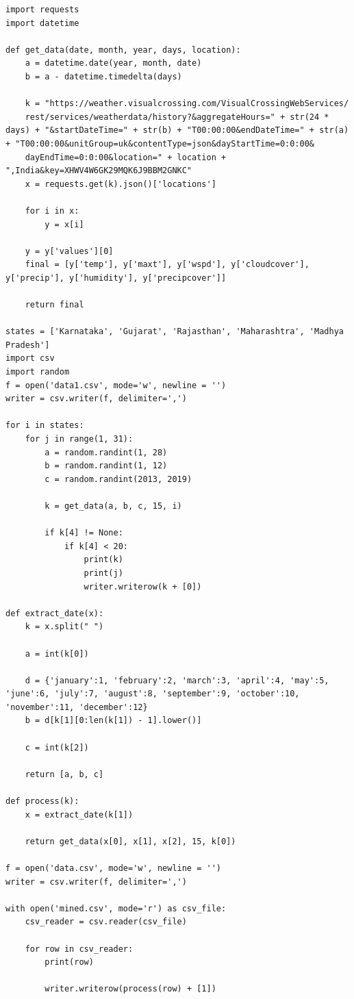 \documentclass[a4paper,12pt]{report}
\begin{document}
\begin{lstlisting}
import requests
import datetime

def get_data(date, month, year, days, location):
    a = datetime.date(year, month, date)
    b = a - datetime.timedelta(days)
    
    k = "https://weather.visualcrossing.com/VisualCrossingWebServices/
    rest/services/weatherdata/history?&aggregateHours=" + str(24 * days) + "&startDateTime=" + str(b) + "T00:00:00&endDateTime=" + str(a) + "T00:00:00&unitGroup=uk&contentType=json&dayStartTime=0:0:00&
    dayEndTime=0:0:00&location=" + location + ",India&key=XHWV4W6GK29MQK6J9BBM2GNKC"
    x = requests.get(k).json()['locations']
    
    for i in x:
        y = x[i]

    y = y['values'][0]
    final = [y['temp'], y['maxt'], y['wspd'], y['cloudcover'], y['precip'], y['humidity'], y['precipcover']]

    return final

states = ['Karnataka', 'Gujarat', 'Rajasthan', 'Maharashtra', 'Madhya Pradesh']
import csv
import random
f = open('data1.csv', mode='w', newline = '')
writer = csv.writer(f, delimiter=',')

for i in states:
    for j in range(1, 31):
        a = random.randint(1, 28)
        b = random.randint(1, 12)
        c = random.randint(2013, 2019)

        k = get_data(a, b, c, 15, i)

        if k[4] != None:
            if k[4] < 20:
                print(k)
                print(j)
                writer.writerow(k + [0])

def extract_date(x):
    k = x.split(" ")

    a = int(k[0])

    d = {'january':1, 'february':2, 'march':3, 'april':4, 'may':5, 'june':6, 'july':7, 'august':8, 'september':9, 'october':10, 'november':11, 'december':12}
    b = d[k[1][0:len(k[1]) - 1].lower()]

    c = int(k[2])

    return [a, b, c]

def process(k):
    x = extract_date(k[1])

    return get_data(x[0], x[1], x[2], 15, k[0])

f = open('data.csv', mode='w', newline = '')
writer = csv.writer(f, delimiter=',')

with open('mined.csv', mode='r') as csv_file:
    csv_reader = csv.reader(csv_file)
    
    for row in csv_reader:
        print(row)
        
        writer.writerow(process(row) + [1])
\end{lstlisting}
\end{document}
